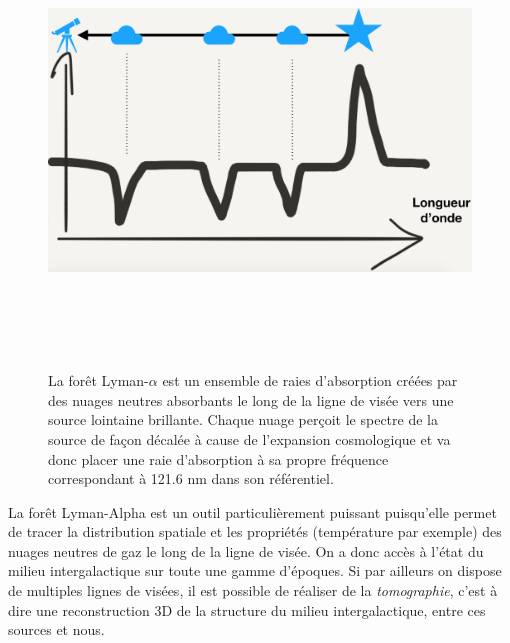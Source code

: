 \begin{figure}[htbp]
	\centering
		\includegraphics[height=12cm]{figs/lya.png}
		\caption[Principe de la forêt Lyman-$\alpha$]{La forêt Lyman-$\alpha$ est un ensemble de raies d'absorption créées par des nuages neutres absorbants le long de la ligne de visée vers une source lointaine brillante. Chaque nuage perçoit le spectre de la source de façon décalée à cause de l'expansion cosmologique et va donc placer une raie d'absorption à sa propre fréquence correspondant à 121.6 nm dans son référentiel.}
	\label{f:lya}
\end{figure}

La forêt Lyman-Alpha est un outil particulièrement puissant puisqu'elle permet de tracer la distribution spatiale et les propriétés (température par exemple) des nuages neutres de gaz le long de la ligne de visée. On a donc accès à l'état du milieu intergalactique sur toute une gamme d'époques. Si par ailleurs on dispose de multiples lignes de visées, il est possible de réaliser de la \textit{tomographie}, c'est à dire une reconstruction 3D de la structure du milieu intergalactique, entre ces sources et nous.

